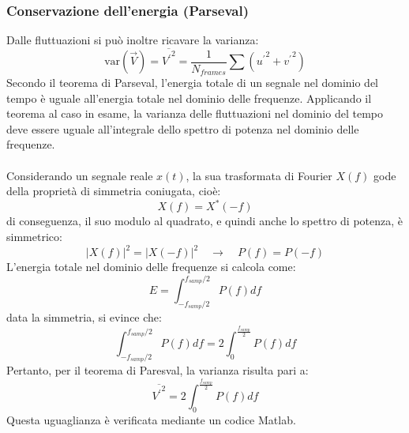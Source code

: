 \subsubsection{Conservazione dell'energia (Parseval)}
Dalle fluttuazioni si può inoltre ricavare la varianza:
\begin{equation*}
    \text{var}(\vec V) = \overline{{V^\prime}^2} = \frac 1{N_{frames}} \sum ({u^\prime}^2 + {v^\prime}^2)
\end{equation*}
Secondo il teorema di Parseval, l'energia totale di un segnale nel dominio del tempo è uguale all'energia totale nel dominio delle frequenze. Applicando il teorema al caso in esame, la varianza delle fluttuazioni nel dominio del tempo deve essere uguale all'integrale dello spettro di potenza nel dominio delle frequenze.\\\\
Considerando un segnale reale $x(t)$, la sua trasformata di Fourier $X(f)$ gode della proprietà di simmetria coniugata, cioè:
\begin{equation*}
    X(f) = X^*(-f)
\end{equation*}
di conseguenza, il suo modulo al quadrato, e quindi anche lo spettro di potenza, è simmetrico:
\begin{equation*}
    |X(f)|^2 = |X(-f)|^2 \quad \rightarrow \quad P(f) = P(-f)
\end{equation*}
L'energia totale nel dominio delle frequenze si calcola come:
\begin{equation*}
    E = \int_{-f_{samp}/2}^{f_{samp}/2} P(f) df
\end{equation*}
data la simmetria, si evince che:
\begin{equation*}
    \int_{-f_{samp}/2}^{f_{samp}/2} P(f) df = 2\int_0^{\frac{f_{samp}}2} P(f) df
\end{equation*}
Pertanto, per il teorema di Paresval, la varianza risulta pari a:
\begin{equation*}
    \overline{{V^\prime}^2} = 2\int_0^{\frac{f_{samp}}2} P(f) df
\end{equation*}
Questa uguaglianza è verificata mediante un codice Matlab.

